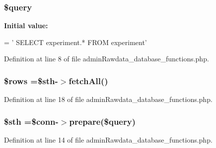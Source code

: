 \hypertarget{admin_rawdata_2admin_rawdata__database__functions_8php_af59a5f7cd609e592c41dc3643efd3c98}{
\subsubsection[{\$query}]{\setlength{\rightskip}{0pt plus 5cm}\$query}}\label{admin_rawdata_2admin_rawdata__database__functions_8php_af59a5f7cd609e592c41dc3643efd3c98}
{\bfseries Initial value\-:}
\begin{DoxyCode}
= \textcolor{stringliteral}{'}
\textcolor{stringliteral}{    SELECT }
\textcolor{stringliteral}{        experiment.*}
\textcolor{stringliteral}{    FROM }
\textcolor{stringliteral}{        experiment'}
\end{DoxyCode}


Definition at line 8 of file admin\-Rawdata\-\_\-database\-\_\-functions.\-php.

\hypertarget{admin_rawdata_2admin_rawdata__database__functions_8php_ace2ec39e7df3899fa8df9640ec274b03}{
\subsubsection[{\$rows}]{\setlength{\rightskip}{0pt plus 5cm}\$rows =\$sth-\/$>$fetch\-All()}}\label{admin_rawdata_2admin_rawdata__database__functions_8php_ace2ec39e7df3899fa8df9640ec274b03}


Definition at line 18 of file admin\-Rawdata\-\_\-database\-\_\-functions.\-php.

\hypertarget{admin_rawdata_2admin_rawdata__database__functions_8php_afa9126f9664959c02795be300a135f93}{
\subsubsection[{\$sth}]{\setlength{\rightskip}{0pt plus 5cm}\$sth =\$conn-\/$>$prepare(\$query)}}\label{admin_rawdata_2admin_rawdata__database__functions_8php_afa9126f9664959c02795be300a135f93}


Definition at line 14 of file admin\-Rawdata\-\_\-database\-\_\-functions.\-php.

